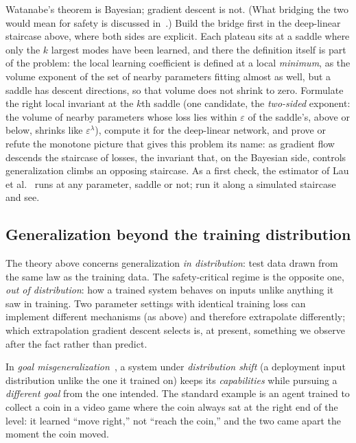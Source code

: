 \begin{openproblem}
Watanabe's theorem is Bayesian; gradient descent is not. (What bridging the two would mean for safety is discussed in~\cite{lehalleur2025}.) Build the bridge first in the deep-linear staircase above, where both sides are explicit. Each plateau sits at a saddle where only the $k$ largest modes have been learned, and there the definition itself is part of the problem: the local learning coefficient is defined at a local \emph{minimum}, as the volume exponent of the set of nearby parameters fitting almost as well, but a saddle has descent directions, so that volume does not shrink to zero. Formulate the right local invariant at the $k$th saddle (one candidate, the \emph{two-sided} exponent: the volume of nearby parameters whose loss lies within $\varepsilon$ of the saddle's, above or below, shrinks like $\varepsilon^{\lambda}$), compute it for the deep-linear network, and prove or refute the monotone picture that gives this problem its name: as gradient flow descends the staircase of losses, the invariant that, on the Bayesian side, controls generalization climbs an opposing staircase. As a first check, the estimator of Lau et al.~\cite{lau2023} runs at any parameter, saddle or not; run it along a simulated staircase and see.
\end{openproblem}

\subsection{Generalization beyond the training distribution}

The theory above concerns generalization \emph{in distribution}: test data drawn from the same law as the training data. The safety-critical regime is the opposite one, \emph{out of distribution}: how a trained system behaves on inputs unlike anything it saw in training. Two parameter settings with identical training loss can implement different mechanisms (as above) and therefore extrapolate differently; which extrapolation gradient descent selects is, at present, something we observe after the fact rather than predict.

In \emph{goal misgeneralization}~\cite{langosco2022}, a system under \emph{distribution shift} (a deployment input distribution unlike the one it trained on) keeps its \emph{capabilities} while pursuing a \emph{different goal} from the one intended. The standard example is an agent trained to collect a coin in a video game where the coin always sat at the right end of the level: it learned ``move right,'' not ``reach the coin,'' and the two came apart the moment the coin moved. 

